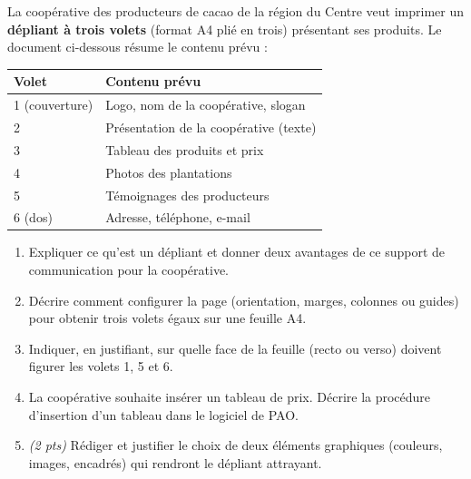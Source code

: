 \documentclass[11pt]{article}
\begin{document}
\begin{exercice}
La coopérative des producteurs de cacao de la région du Centre veut imprimer un \textbf{dépliant à trois volets} (format A4 plié en trois) présentant ses produits. Le document ci-dessous résume le contenu prévu :
\begin{center}
\begin{tabular}{|l|l|}
\hline
\textbf{Volet} & \textbf{Contenu prévu} \\
\hline
1 (couverture) & Logo, nom de la coopérative, slogan \\
\hline
2 & Présentation de la coopérative (texte) \\
\hline
3 & Tableau des produits et prix \\
\hline
4 & Photos des plantations \\
\hline
5 & Témoignages des producteurs \\
\hline
6 (dos) & Adresse, téléphone, e-mail \\
\hline
\end{tabular}
\end{center}
\begin{enumerate}
  \item Expliquer ce qu'est un dépliant et donner deux avantages de ce support de communication pour la coopérative.
  \item Décrire comment configurer la page (orientation, marges, colonnes ou guides) pour obtenir trois volets égaux sur une feuille A4.
  \item Indiquer, en justifiant, sur quelle face de la feuille (recto ou verso) doivent figurer les volets 1, 5 et 6.
  \item La coopérative souhaite insérer un tableau de prix. Décrire la procédure d'insertion d'un tableau dans le logiciel de PAO.
  \item \textit{(2 pts)} Rédiger et justifier le choix de deux éléments graphiques (couleurs, images, encadrés) qui rendront le dépliant attrayant.
\end{enumerate}
\end{exercice}
\end{document}
